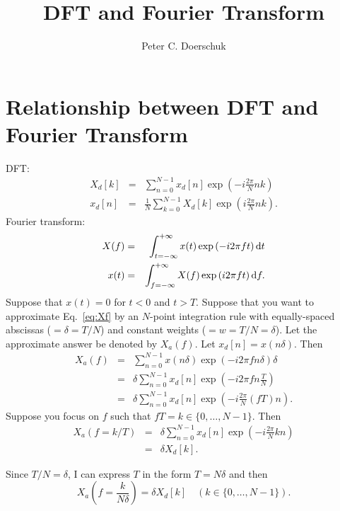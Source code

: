 \documentclass{article}
\newcommand{\dd }{{\rm d}}
\begin{document}
\title{DFT and Fourier Transform}
\author{Peter C. Doerschuk}
\maketitle
\section{Relationship between DFT and Fourier Transform}
DFT:
\begin{eqnarray}
X_d[k]
&=&
\sum_{n=0}^{N-1} x_d[n] \exp\left(-i \frac{2\pi}{N} nk \right)
\\
x_d[n]
&=&
\frac{1}{N} \sum_{k=0}^{N-1} X_d[k] \exp\left(i \frac{2\pi}{N} nk \right)
.
\end{eqnarray}
Fourier transform:
\begin{eqnarray}
X(f)
&=&
\int_{t=-\infty}^{+\infty} x(t) \exp\left(-i 2\pi ft\right) \dd t
\label{eq:Xf}
\\
x(t)
&=&
\int_{f=-\infty}^{+\infty} X(f) \exp\left(i 2\pi ft\right) \dd f
.
\end{eqnarray}
Suppose that $x(t)=0$ for $t<0$ and $t>T$.
Suppose that you want to approximate Eq.~\ref{eq:Xf} by an $N$-point
integration rule with equally-spaced abscissas ($=\delta=T/N$) and constant
weights ($=w=T/N=\delta$).
Let the approximate answer be denoted by $X_a(f)$.
Let $x_d[n]=x(n\delta)$.
Then
\begin{eqnarray}
X_a(f)
&=&
\sum_{n=0}^{N-1} x(n \delta) \exp\left(-i 2\pi f n \delta\right) \delta
\\
&=&
\delta
\sum_{n=0}^{N-1} x_d[n] \exp\left(-i 2\pi f n \frac{T}{N}\right)
\\
&=&
\delta
\sum_{n=0}^{N-1} x_d[n] \exp\left(-i \frac{2\pi}{N} (fT) n\right)
.
\end{eqnarray}
Suppose you focus on $f$ such that $fT=k\in\{0,\dots,N-1\}$.
Then
\begin{eqnarray}
X_a(f=k/T)
&=&
\delta
\sum_{n=0}^{N-1} x_d[n] \exp\left(-i \frac{2\pi}{N} k n\right)
\\
&=&
\delta
X_d[k]
.
\end{eqnarray}
\par
Since $T/N=\delta$, I can express $T$ in the form $T=N\delta$ and then
\begin{equation}
X_a\left(f=\frac{k}{N\delta}\right)
=
\delta
X_d[k]
\quad
(k\in\{0,\dots,N-1\})
.
\end{equation}
\end{document}
